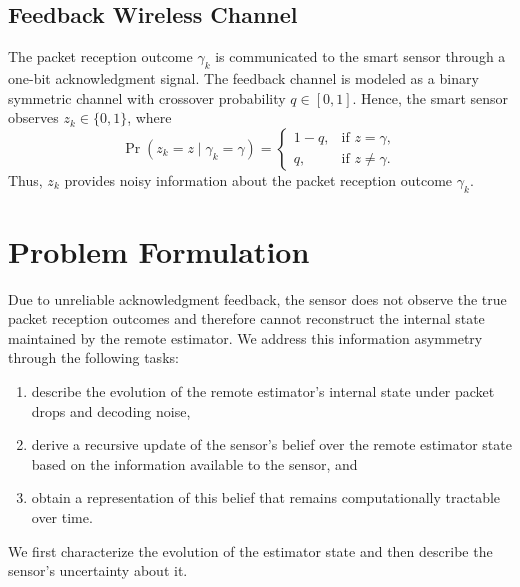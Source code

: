 \documentclass[letterpaper, 10 pt, conference]{ieeeconf}
\begin{document}
\subsection{Feedback Wireless Channel}
\label{subsec:feeback_channel}
The packet reception outcome $\gamma_k$ is communicated to the smart sensor through a one-bit acknowledgment signal.
The feedback channel is modeled as a binary symmetric channel with crossover probability $q \in [0,1]$. Hence, the smart sensor observes $z_k \in \{0,1\}$, where
\begin{equation*}
    \operatorname{Pr}(z_k=z\mid \gamma_k=\gamma) =
\begin{cases}
1-q, & \text{if }z=\gamma,\\[3pt]
q, & \text{if }z\neq\gamma.
\end{cases}
\end{equation*}
Thus, $z_k$ provides noisy information about the packet reception outcome $\gamma_k$.

\section{Problem Formulation}\label{sec.problem.formulation}
Due to unreliable acknowledgment feedback, the  sensor does not  observe the true packet reception outcomes and therefore cannot  reconstruct the internal  state maintained by the remote estimator. We address this information asymmetry through the following tasks:
\begin{enumerate}
    \item[a)] describe the evolution of the remote estimator's internal state under packet drops and decoding noise, 
    \item[b)] derive a recursive update of the sensor’s belief over the remote estimator state based on the information available to the sensor, and 
    \item[c)] obtain a representation of this belief that remains computationally tractable over time. 
\end{enumerate}
We first characterize the evolution of the estimator state and then describe the sensor's uncertainty about it.
\end{document}
